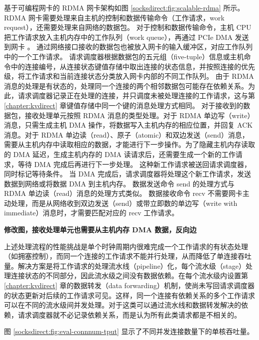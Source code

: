 基于可编程网卡的 RDMA 网卡架构如图 \ref{socksdirect:fig:scalable-rdma} 所示。
RDMA 网卡需要处理来自主机的控制和数据传输命令（工作请求，work request），还需要处理来自网络的数据包。
对于控制和数据传输命令，主机 CPU 把工作请求放入主机内存中的工作队列（work queue），再通过 PCIe DMA 发送到网卡 \cite{kalia2016design}。
通过网络接口接收的数据包也被放入网卡的输入缓冲区，对应工作队列中的一个工作请求。
请求调度器根据数据包的五元组（five-tuple）信息或主机命令中的连接编号，从连接状态键值存储中取出连接的状态信息，并按照连接的优先级，将工作请求和当前连接状态分类放入网卡内部的不同工作队列。
由于 RDMA 消息的处理是有状态的，处理同一个连接的两个相邻数据包可能存在依赖关系。为此，请求调度器记录正在处理的连接，并只调度未被处理连接的工作请求，这与第 \ref{chapter:kvdirect} 章键值存储中同一个键的消息处理方式相同。
对于接收到的数据包，接收处理单元按照 RDMA 消息的类型处理。对于 RDMA 单边写（write）消息，只需生成主机 DMA 操作，将数据写入主机内存的相应位置，并回复 ACK 消息。对于 RDMA 单边读（read）、原子（atomic）和双边发送（send）消息，需要从主机内存中读取相应的数据，才能进行下一步操作。为了隐藏主机内存读取的 DMA 延迟，生成主机内存的 DMA 读请求后，还需要生成一个新的工作请求，等待 DMA 完成后再进行下一步处理。
这种新工作请求被送回请求调度器，同时标记等待条件。
当 DMA 完成后，请求调度器将处理这个新工作请求，发送数据到网络或将数据 DMA 到主机内存。
数据发送命令 send 的处理方式与 RDMA 单边读（read）消息的处理方式类似。
数据接收命令 recv 不需要网卡主动处理，而是从网络收到双边发送（send）或带立即数的单边写（write with immediate）消息时，才需要匹配对应的 recv 工作请求。

\textbf{修改图，接收处理单元也需要从主机内存 DMA 数据，反向边}

上述处理流程的性能挑战是单个时钟周期内很难完成一个工作请求的有状态处理（如拥塞控制），而同一个连接的工作请求不能并行处理，从而降低了单连接吞吐量。解决方案是将工作请求的处理流水线（pipeline）化，每个流水级（stage）处理连接状态的不同部分，因此流水级之间没有数据依赖。在每个流水级内设置第 \ref{chapter:kvdirect} 章的数据转发（data forwarding）机制，使尚未写回请求调度器的状态更新对后续的工作请求可见。这样，同一个连接有依赖关系的多个工作请求可以在不同的流水级间并发处理。对于这类可以通过流水线和数据转发解决的依赖，请求调度器就不必记录依赖关系，而是认为所有此类请求都是不相关的。

图 \ref{socksdirect:fig:eval-connnum-tput} 显示了不同并发连接数量下的单核吞吐量。

